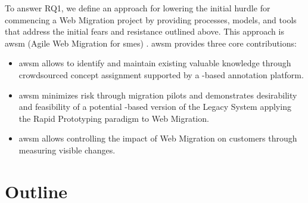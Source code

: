 To answer RQ1, we define an approach for lowering the initial hurdle for commencing a \gls{Web Migration} project by providing processes, models, and tools that address the initial fears and resistance outlined above.
This approach is \gls{awsm} (Agile Web Migration for \glspl{sme}) \autocite{Heil2016AWSM}.
\gls{awsm} provides three core contributions:

\begin{itemize}
\tightlist
\item
  \gls{awsm} allows to identify and maintain existing valuable knowledge through crowdsourced concept assignment supported by a -based annotation platform.
\item
  \gls{awsm} minimizes risk through migration pilots and demonstrates desirability and feasibility of a potential -based version of the \gls{Legacy System} applying the \gls{Rapid Prototyping} paradigm to \gls{Web Migration}.
\item
  \gls{awsm} allows controlling the impact of \gls{Web Migration} on customers through measuring visible changes.
\end{itemize}

\hypertarget{structure-of-this-thesis}{%
\section{Outline}\label{structure-of-this-thesis}}

